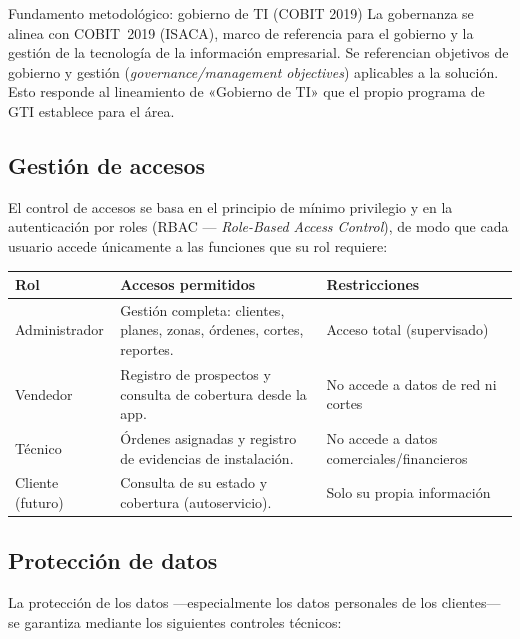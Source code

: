 \begin{upeubox}{Fundamento metodológico: gobierno de TI (COBIT 2019)}
La gobernanza se alinea con COBIT~2019 (ISACA), marco de referencia para el gobierno y
la gestión de la tecnología de la información empresarial. Se referencian objetivos de
gobierno y gestión (\textit{governance/management objectives}) aplicables a la
solución. Esto responde al lineamiento de «Gobierno de TI» que el propio programa de
GTI establece para el área.
\end{upeubox}

\subsection{Gestión de accesos}

El control de accesos se basa en el principio de mínimo privilegio y en la autenticación
por roles (RBAC --- \textit{Role-Based Access Control}), de modo que cada usuario accede
únicamente a las funciones que su rol requiere:

\begin{center}
\label{tab:accesos}
\begin{tabularx}{\textwidth}{L{2.6cm} X L{3.6cm}}
\toprule
\textbf{Rol} & \textbf{Accesos permitidos} & \textbf{Restricciones} \\
\midrule
Administrador &
Gestión completa: clientes, planes, zonas, órdenes, cortes, reportes. &
Acceso total (supervisado) \\
Vendedor &
Registro de prospectos y consulta de cobertura desde la app. &
No accede a datos de red ni cortes \\
Técnico &
Órdenes asignadas y registro de evidencias de instalación. &
No accede a datos comerciales/financieros \\
Cliente (futuro) &
Consulta de su estado y cobertura (autoservicio). &
Solo su propia información \\
\bottomrule
\end{tabularx}
\end{center}

\subsection{Protección de datos}

La protección de los datos ---especialmente los datos personales de los clientes--- se
garantiza mediante los siguientes controles técnicos:

